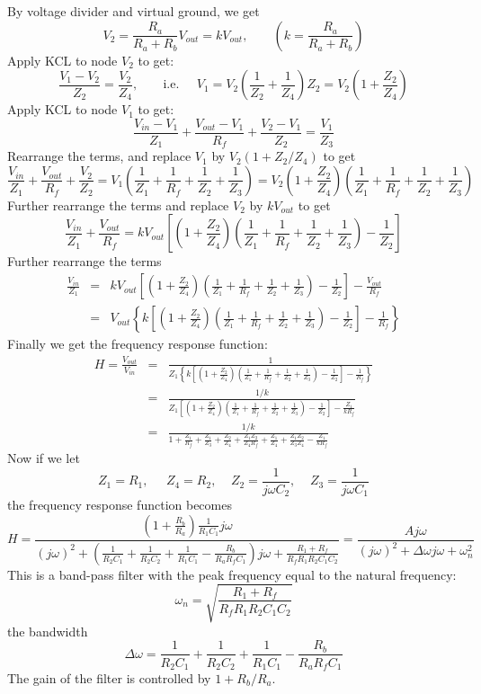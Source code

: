   By voltage divider and virtual ground, we get
  \[
  V_2=\frac{R_a}{R_a+R_b}V_{out}=kV_{out},\;\;\;\;\;\;\;\left(k=\frac{R_a}{R_a+R_b}\right)
  \]
  Apply KCL to node $V_2$ to get:
  \[
  \frac{V_1-V_2}{Z_2}=\frac{V_2}{Z_4},\;\;\;\;\;\;\;\mbox{i.e.}\;\;\;\;\;
  V_1=V_2\left(\frac{1}{Z_2}+\frac{1}{Z_4}\right)Z_2
  =V_2\left(1+\frac{Z_2}{Z_4}\right)
  \]
  Apply KCL to node $V_1$ to get:
  \[
  \frac{V_{in}-V_1}{Z_1}+\frac{V_{out}-V_1}{R_f}+\frac{V_2-V_1}{Z_2}
  =\frac{V_1}{Z_3}
  \]
  Rearrange the terms, and replace $V_1$ by $V_2(1+Z_2/Z_4)$ to get
  \[
  \frac{V_{in}}{Z_1}+\frac{V_{out}}{R_f}+\frac{V_2}{Z_2}
  =V_1\left(\frac{1}{Z_1}+\frac{1}{R_f}+\frac{1}{Z_2}+\frac{1}{Z_3}\right)
  =V_2\left(1+\frac{Z_2}{Z_4}\right)\left(\frac{1}{Z_1}
  +\frac{1}{R_f}+\frac{1}{Z_2}+\frac{1}{Z_3}\right)
  \]
  Further rearrange the terms and replace $V_2$ by $kV_{out}$ to get
  \[
  \frac{V_{in}}{Z_1}+\frac{V_{out}}{R_f}
  =kV_{out}\left[\left(1+\frac{Z_2}{Z_4}\right)\left(\frac{1}{Z_1}+\frac{1}{R_f}
    +\frac{1}{Z_2}+\frac{1}{Z_3}\right)-\frac{1}{Z_2}\right]
  \]
  Further rearrange the terms
  \begin{eqnarray}
    \frac{V_{in}}{Z_1}&=&kV_{out}\left[\left(1+\frac{Z_2}{Z_4}\right)
\left(\frac{1}{Z_1}
      +\frac{1}{R_f}+\frac{1}{Z_2}+\frac{1}{Z_3}\right)-\frac{1}{Z_2}\right]-\frac{V_{out}}{R_f}
    \nonumber \\
    &=&
    V_{out}\left\{k\left[\left(1+\frac{Z_2}{Z_4}\right)\left(\frac{1}{Z_1}
      +\frac{1}{R_f}+\frac{1}{Z_2}+\frac{1}{Z_3}\right)-\frac{1}{Z_2}\right]-\frac{1}{R_f}\right\}
    \nonumber 
  \end{eqnarray}
  Finally we get the frequency response function:
  \begin{eqnarray}
    H=\frac{V_{out}}{V_{in}}&=&
    \frac{1}{Z_1\left\{k\left[\left(1+\frac{Z_2}{Z_4}\right)\left(\frac{1}{Z_1}+\frac{1}{R_f}+\frac{1}{Z_2}+\frac{1}{Z_3}\right)-\frac{1}{Z_2}\right]-\frac{1}{R_f}\right\}}
    \nonumber \\
    &=&
    \frac{1/k}{Z_1\left[\left(1+\frac{Z_2}{Z_4}\right)\left(\frac{1}{Z_1}+\frac{1}{R_f}+\frac{1}{Z_2}+\frac{1}{Z_3}\right)-\frac{1}{Z_2}\right]-\frac{Z_1}{kR_f}}
    \nonumber \\
    &=&
    \frac{1/k}{1+\frac{Z_1}{R_f}+\frac{Z_1}{Z_3}+\frac{Z_2}{Z_4}+\frac{Z_1Z_2}{Z_4R_f}+\frac{Z_1}{Z_4}+\frac{Z_1Z_2}{Z_3Z_4}-\frac{Z_1}{kR_f}}
    \nonumber
  \end{eqnarray}
  Now if we let
  \[
  Z_1=R_1,\;\;\;\;\;Z_4=R_2,\;\;\;\;Z_2=\frac{1}{j\omega C_2},
  \;\;\;\;Z_3=\frac{1}{j\omega C_1}
  \]
  the frequency response function becomes
  \[
  H=\frac{\left(1+\frac{R_b}{R_a}\right)\frac{1}{R_1C_1}j\omega}{(j\omega)^2+\left(\frac{1}{R_2C_1}+\frac{1}{R_2C_2}+\frac{1}{R_1C_1}-\frac{R_b}{R_aR_fC_1}\right)j\omega+\frac{R_1+R_f}{R_fR_1R_2C_1C_2}}
  =\frac{Aj\omega}{(j\omega)^2+\Delta\omega j\omega+\omega_n^2}
  \]
  This is a band-pass filter with the peak frequency equal to the natural
  frequency:
  \[
  \omega_n=\sqrt{\frac{R_1+R_f}{R_fR_1R_2C_1C_2}}
  \]
  the bandwidth
  \[
  \Delta\omega=\frac{1}{R_2C_1}+\frac{1}{R_2C_2}+\frac{1}{R_1C_1}-\frac{R_b}{R_aR_fC_1}
  \]
  The gain of the filter is controlled by $1+R_b/R_a$.
  

